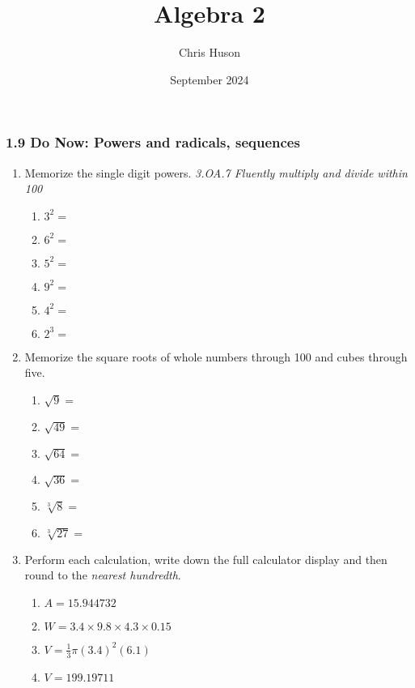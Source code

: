 \documentclass[12pt, twoside]{article}
\title{Algebra 2}
\author{Chris Huson}
\date{September 2024}
\begin{document}
\subsubsection*{1.9 Do Now: Powers and radicals, sequences}
\begin{enumerate}[itemsep=0.5cm]

\item Memorize the single digit powers. \hfill \emph{3.OA.7 Fluently multiply and divide within 100}
    \begin{multicols}{2}
        \begin{enumerate}[itemsep=0.5cm]
            \item $3^2 =$
            \item $6^2 =$
            \item $5^2 =$
            \item $9^2 =$
            \item $4^2 =$
            \item $2^3 =$
        \end{enumerate}
    \end{multicols}

\item Memorize the square roots of whole numbers through 100 and cubes through five.
    \begin{multicols}{2}
        \begin{enumerate}[itemsep=0.5cm]
            \item $\sqrt{9} =$
            \item $\sqrt{49} =$
            \item $\sqrt{64} =$
            \item $\sqrt{36} =$
            \item $\sqrt[3]{8} =$
            \item $\sqrt[3]{27} =$
          \end{enumerate}
    \end{multicols} \vspace{0.25cm}


\item Perform each calculation, write down the full calculator display and then round to the \emph{nearest hundredth}.
    \begin{multicols}{2}
    \begin{enumerate}[itemsep=1.5cm]
      \item $A=15.944732$
      \item $W=3.4 \times 9.8 \times 4.3 \times 0.15$
      \item $V=\frac{1}{3} \pi (3.4)^2(6.1)$
      \item $V=199.19711$
    \end{enumerate}
    \end{multicols} \vspace{1cm}


\end{enumerate}
\end{document}
